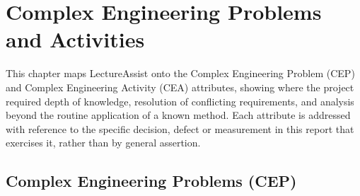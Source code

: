 \chapter{Complex Engineering Problems and Activities}
\label{ch:cep}

This chapter maps LectureAssist onto the Complex Engineering Problem (CEP) and
Complex Engineering Activity (CEA) attributes, showing where the project required
depth of knowledge, resolution of conflicting requirements, and analysis beyond the
routine application of a known method. Each attribute is addressed with reference to
the specific decision, defect or measurement in this report that exercises it, rather
than by general assertion.

\section{Complex Engineering Problems (CEP)}
\label{sec:cep}

